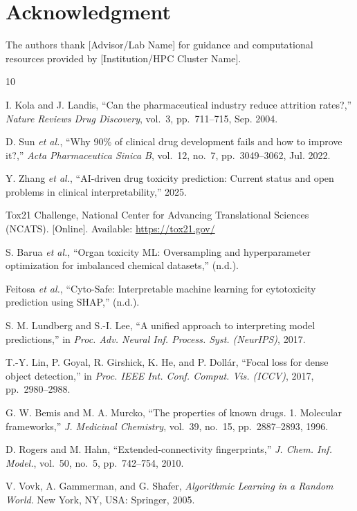 \documentclass[lettersize,journal]{IEEEtran}
\begin{document}
\section*{Acknowledgment}
The authors thank [Advisor/Lab Name] for guidance and computational resources
provided by [Institution/HPC Cluster Name].

\begin{thebibliography}{10}


I. Kola and J. Landis, ``Can the pharmaceutical industry reduce attrition
rates?,'' \textit{Nature Reviews Drug Discovery}, vol.~3, pp.~711--715,
Sep. 2004.

D. Sun \textit{et al.}, ``Why 90\% of clinical drug development fails and
how to improve it?,'' \textit{Acta Pharmaceutica Sinica B}, vol.~12, no.~7,
pp.~3049--3062, Jul. 2022.

Y. Zhang \textit{et al.}, ``AI-driven drug toxicity prediction: Current
status and open problems in clinical interpretability,'' 2025.

Tox21 Challenge, National Center for Advancing Translational Sciences
(NCATS). [Online]. Available: \url{https://tox21.gov/}

S. Barua \textit{et al.}, ``Organ toxicity ML: Oversampling and
hyperparameter optimization for imbalanced chemical datasets,'' (n.d.).

Feitosa \textit{et al.}, ``Cyto-Safe: Interpretable machine learning for
cytotoxicity prediction using SHAP,'' (n.d.).

S. M. Lundberg and S.-I. Lee, ``A unified approach to interpreting model
predictions,'' in \textit{Proc. Adv. Neural Inf. Process. Syst. (NeurIPS)},
2017.

T.-Y. Lin, P. Goyal, R. Girshick, K. He, and P. Doll\'{a}r, ``Focal loss
for dense object detection,'' in \textit{Proc. IEEE Int. Conf. Comput.
Vis. (ICCV)}, 2017, pp.~2980--2988.

G. W. Bemis and M. A. Murcko, ``The properties of known drugs. 1. Molecular
frameworks,'' \textit{J. Medicinal Chemistry}, vol.~39, no.~15,
pp.~2887--2893, 1996.

D. Rogers and M. Hahn, ``Extended-connectivity fingerprints,''
\textit{J. Chem. Inf. Model.}, vol.~50, no.~5, pp.~742--754, 2010.

V. Vovk, A. Gammerman, and G. Shafer, \textit{Algorithmic Learning in a
Random World}. New York, NY, USA: Springer, 2005.

\end{thebibliography}
\end{document}
